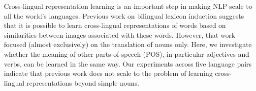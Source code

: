 Cross-lingual representation learning is an important step in making NLP scale to all the world's languages. Previous work on bilingual lexicon induction suggests that it is possible to learn cross-lingual representations of words based on similarities between images associated with these words. However, that work focused (almost exclusively) on the translation of nouns only. Here, we investigate whether the meaning of other parts-of-speech (POS), in particular adjectives and verbs, can be learned in the same way. Our experiments across five language pairs indicate that previous work does not scale to the problem of learning cross-lingual representations beyond simple nouns.
